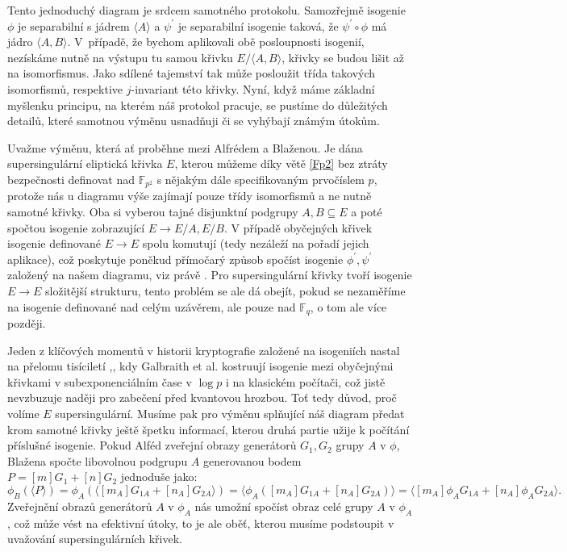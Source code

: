 \documentclass[12pt]{report}
\begin{document}
Tento jednoduchý diagram je srdcem samotného protokolu. Samozřejmě isogenie $\phi$ je separabilní s jádrem $\langle A \rangle$ a $\psi^\prime$ je separabilní isogenie taková, že $\psi^\prime \circ \phi$ má jádro $\langle A,B \rangle$. V~případě, že bychom aplikovali obě posloupnosti isogenií, nezískáme nutně na výstupu tu samou křivku $E/\langle A,B \rangle$, křivky se budou lišit až na isomorfismus. Jako sdílené tajemství tak může posloužit třída takových isomorfismů, respektive $j$-invariant této křivky. Nyní, když máme základní myšlenku principu, na kterém náš protokol pracuje, se pustíme do důležitých detailů, které samotnou výměnu usnadňuji či se vyhýbají známým útokům.

Uvažme výměnu, která ať proběhne mezi Alfrédem a Blaženou. Je dána supersingulární eliptická křivka $E$, kterou můžeme díky větě \ref{Fp2} bez ztráty bezpečnosti definovat nad $\mathbb{F}_{p^2}$ s nějakým dále specifikovaným prvočíslem $p$, protože nás u diagramu výše zajímají pouze třídy isomorfismů a ne nutně samotné křivky. Oba si vyberou tajné disjunktní podgrupy $A,B \subseteq E$ a poté spočtou isogenie zobrazující $E \longrightarrow E/A,E/B$. V případě obyčejných křivek isogenie definované $E \longrightarrow E$ spolu komutují (tedy nezáleží na pořadí jejich aplikace), což poskytuje poněkud přímočarý způsob spočíst isogenie $\phi^\prime,\psi^\prime$ založený na našem diagramu, viz právě \cite{Stolbunov}. Pro supersingulární křivky tvoří isogenie $E \longrightarrow E$ složitější strukturu, tento problém se ale dá obejít, pokud se nezaměříme na isogenie definované nad celým uzávěrem, ale pouze nad $\mathbb{F}_q$, o tom ale více později. 

Jeden z klíčových momentů v historii kryptografie založené na isogeniích nastal na přelomu tisíciletí \cite{Galbraith},\cite{Galbraith2}, kdy Galbraith et al. kostruují isogenie mezi obyčejnými křivkami v subexponenciálním čase v $\log p$ i na klasickém počítači, což jistě nevzbuzuje naději pro zabečení před kvantovou hrozbou. Toť tedy důvod, proč volíme $E$ supersingulární. Musíme pak pro výměnu splňující náš diagram předat krom samotné křivky ještě špetku informací, kterou druhá partie užije k počítání příslušné isogenie. Pokud Alféd zveřejní obrazy generátorů $G_{1},G_{2}$ grupy $A$ v $\phi$, Blažena spočte libovolnou podgrupu $A$ generovanou bodem $P = [m]G_{1} + [n]G_2$ jednoduše jako:
\begin{equation*}\label{clubsuit}
\phi_B (\langle P \rangle) = \phi_A (\langle [m_A] G_{1A} + [n_A] G_{2A} \rangle) = \langle \phi_A ([m_A] G_{1A} + [n_A] G_{2A}) \rangle = \langle [m_A] \phi_A G_{1A} + [n_A] \phi_A G_{2A} \rangle. \tag{$\clubsuit$}
\end{equation*}
Zveřejnění obrazů generátorů $A$ v $\phi_A$ nás umožní spočíst obraz celé grupy $A$ v $\phi_A$, což může vést na efektivní útoky, to je ale oběť, kterou musíme podstoupit v uvažování supersingulárních křivek.
\end{document}
